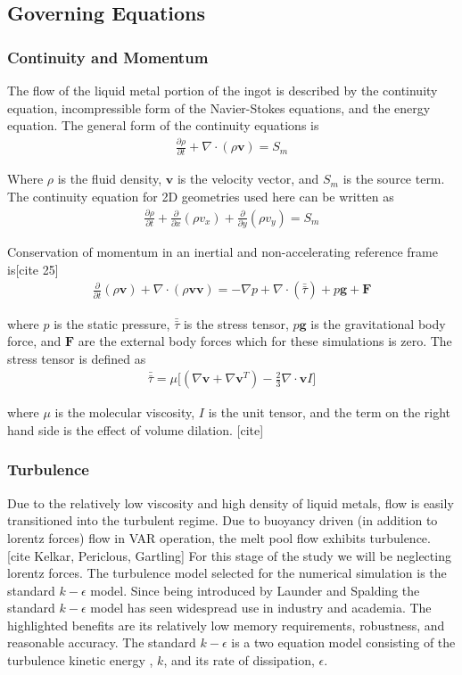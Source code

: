 \documentclass[onehalf,11pt]{beavtex}
\begin{document}
\subsection{Governing Equations}
\subsubsection{Continuity and Momentum} 
The flow of the liquid metal portion of the ingot is described by the continuity equation, incompressible form of the Navier-Stokes equations, and the energy equation. The general form of the continuity equations is
\begin{align}
	\frac{\partial \rho}{\partial t} + \nabla \cdot (\rho \mathbf{v}) = S_m
\end{align}

Where $\rho$ is the fluid density, $\mathbf{v}$ is the velocity vector, and $S_m$ is the source term. 
The continuity equation for 2D geometries used here can be written as
\begin{align}
	\frac{\partial \rho}{\partial t} + \frac{\partial}{\partial x}(\rho v_x) + \frac{\partial}{\partial y}(\rho v_y) = S_m
\end{align}

Conservation of momentum in an inertial and non-accelerating reference frame is[cite 25]
\begin{align}
	\frac{\partial}{\partial t}(\rho\mathbf{v}) + \nabla \cdot (\rho \mathbf{v}\mathbf{v}) = -\nabla p + \nabla \cdot(\bar{\bar{\tau}}) + p \mathbf{g} + \mathbf{F}
\end{align}

where $p$ is the static pressure, $\bar{\bar{\tau}}$ is the stress tensor, $p \mathbf{g}$ is the gravitational body force, and $\mathbf{F}$ are the external body forces which for these simulations is zero. 
The stress tensor is defined as
\begin{align}
	\bar{\bar{\tau}} = \mu \Big[(\nabla \mathbf{v} + \nabla \mathbf{v}^{T}) - \frac{2}{3} \nabla \cdot \mathbf{v} I \Big]
\end{align}

where $\mu$ is the molecular viscosity, $I$ is the unit tensor, and the term on the right hand side is the effect of volume dilation. [cite] 
\subsubsection{Turbulence} 
Due to the relatively low viscosity and high density of liquid metals, flow is easily transitioned into the turbulent regime. 
Due to buoyancy driven (in addition to lorentz forces) flow in VAR operation, the melt pool flow exhibits turbulence. [cite Kelkar, Periclous, Gartling]
For this stage of the study we will be neglecting lorentz forces. 
The turbulence model selected for the numerical simulation is the standard $k-\epsilon$ model.
Since being introduced by Launder and Spalding the standard $k-\epsilon$ model has seen widespread use in industry and academia. 
The highlighted benefits are its relatively low memory requirements, robustness, and reasonable accuracy.
The standard $k-\epsilon$ is a two equation model consisting of the turbulence kinetic energy , $k$, and its rate of dissipation, $\epsilon$.
\end{document}
